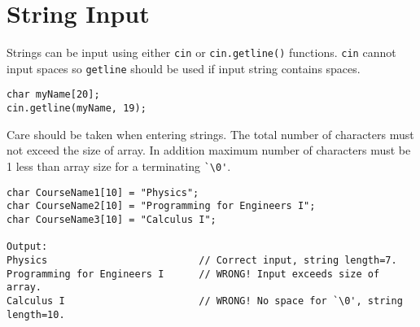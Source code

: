 \documentclass[12pt,a4paper]{article}
\begin{document}
\section{String Input}
Strings can be input using either \texttt{cin} or \texttt{cin.getline()} functions. \texttt{cin} cannot input spaces so \texttt{getline} should be used if input string contains spaces.
\begin{lstlisting}[caption={String input using cin.getline()}]
char myName[20];
cin.getline(myName, 19);
\end{lstlisting}
Care should be taken when entering strings. The total number of characters must not exceed the size of array. In addition maximum number of characters must be 1 less than array size for a terminating \verb|`\0'|.
\begin{lstlisting}[caption={String size and NULL}]
char CourseName1[10] = "Physics";
char CourseName2[10] = "Programming for Engineers I";
char CourseName3[10] = "Calculus I";

Output:
Physics                          // Correct input, string length=7.
Programming for Engineers I      // WRONG! Input exceeds size of array.
Calculus I                       // WRONG! No space for `\0', string length=10.
\end{lstlisting}
\end{document}
